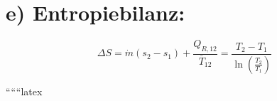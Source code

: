 \section*{e) Entropiebilanz:}

\[
\Delta S = \dot{m} (s_2 - s_1) + \frac{Q_{R,12}}{\overline{T}_{12}} = \frac{T_2 - T_1}{\ln \left( \frac{T_2}{T_1} \right)}
\]

``````latex